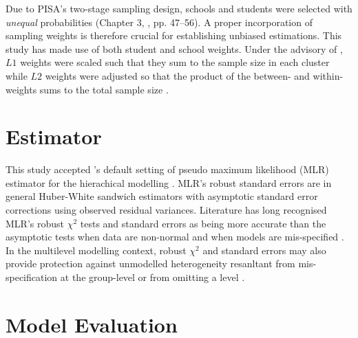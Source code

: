 \documentclass[a4paper,11pt,UKenglish,twoside,openright]{report}\usepackage[]{graphicx}\usepackage[]{color}
\begin{document}
Due to PISA's two-stage sampling design, schools and students were selected with \emph{unequal} probabilities (Chapter 3, \textcite{PISAspss}, pp. 47--56). A proper incorporation of sampling weights is therefore crucial for establishing unbiased estimations. This study has made use of both student and school weights. Under the advisory of \textcite{asparouhov:2006}, $L1$ weights were scaled such that they sum to the sample size in each cluster while $L2$ weights were adjusted so that the product of the between- and within-weights sums to the total sample size \parencite[][pp. 622--624]{mplus:manual}.

\section{Estimator}\label{sec:mlr}

This study accepted \CM's default setting of pseudo maximum likelihood (MLR) estimator for the hierachical modelling \parencite[Chapter 16,][pp. 666 \& 668]{mplus:manual}. MLR's robust standard errors are in general Huber-White sandwich estimators \parencite{huber:1967, white:1982} with asymptotic standard error corrections using observed residual variances. Literature has long recognised MLR's robust $\chi^2$ tests and standard errors as being more accurate than the asymptotic tests when data are non-normal and when models are mis-specified \parencite{chou:1991, curran:1996}. In the multilevel modelling context, robust $\chi^2$ and standard errors may also provide protection against unmodelled heterogeneity resanltant from mis-specification at the group-level or from omitting a level \parencite{hox:2010}.

\section{Model Evaluation}
\end{document}
